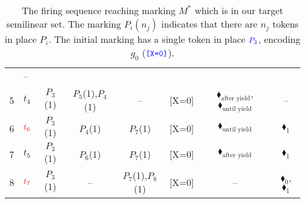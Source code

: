 \begin{table}[H]
{\begin{tabular}{c l c c c c c c}
			& --                                    \\
			5 & $t_4$                                  
			& {\color{blue}$P_3$(1)}                  
			& $P_5$(1),$P_4$(1)                          
			& --                                    
			&                                   {\color{blue}[X=0]}     
			&                                    {\color{black}$\blacklozenge_\text{after yield}$}, {\color{black}$\blacklozenge_\text{until yield}$}   
			& --                                    \\
			6 & $\textcolor{red}{t_6}$                     
			& {\color{blue}$P_3$(1)}                  
			& $P_4$(1)                                
			& {\color{red}$P_7$(1)}                    
			&                                      	{\color{blue}[X=0]}  
			&                                    {\color{black}$\blacklozenge_\text{until yield}$}   
			&                                   {\color{red}$\blacklozenge_1$}     \\
			7 & $t_5$                                  
			& {\color{blue}$P_3$(1)}                  
			& $P_6$(1)                                
			& {\color{red}$P_7$(1)}                    
			&                                   {\color{blue}[X=0]}    
			&                                    {\color{black}$\blacklozenge_\text{after yield}$}      
			&                                   {\color{red}$\blacklozenge_1$}        \\
			8 & $\textcolor{red}{t_7}$                     
			& {\color{blue}$P_3$(1)}                                  
			& --                                    
			& {\color{red}$P_7$(1),\color{red}$P_8$(1)}    
			&                                   {\color{blue}[X=0]}    
			&                                   --    
			&                                   {\color{red}$\blacklozenge_0$}, {\color{red}$\blacklozenge_1$}       \\
			\bottomrule
		\end{tabular}
	}
	\caption{The firing sequence reaching marking $M^*$ which is in our target semilinear set. The marking $P_i(n_j)$ indicates that there are $n_j$ tokens in place $P_i$. The initial marking has a single token in place $\textcolor{blue}{P_3}$, encoding $g_0$ ($\textcolor{blue}{\texttt{[X=0]}}$).}
	\label{tab:PetriNetFiringCounterexample}
\end{table}


